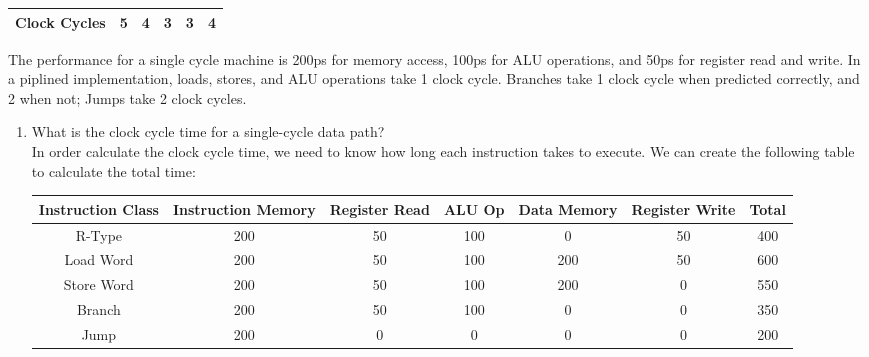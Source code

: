 \documentclass{article}
\begin{document}
\begin{enumerate}
\begin{center}
\begin{tabular}{|l|c|c|c|c|c|}
\hline
Clock Cycles & 5 & 4 & 3 & 3 & 4\\
\hline
\end{tabular}
\end{center}
The performance for a single cycle machine is 200ps for memory access, 100ps for ALU operations, and 50ps for register read and write.
In a piplined implementation, loads, stores, and ALU operations take 1 clock cycle.
Branches take 1 clock cycle when predicted correctly, and 2 when not;
Jumps take 2 clock cycles.
\begin{enumerate}
\item What is the clock cycle time for a single-cycle data path?\\
\indent In order calculate the clock cycle time, we need to know how long each instruction takes to execute.
We can create the following table to calculate the total time:\\

\hspace*{-1.7cm}
\begin{tabular}{|c|c|c|c|c|c|c|}
\hline
Instruction Class & Instruction Memory & Register Read & ALU Op & Data Memory & Register Write & Total\\
\hline
R-Type & 200 & 50 & 100 & 0 & 50 & 400\\
\hline
Load Word & 200 & 50 & 100 & 200 & 50 & 600\\
\hline
Store Word & 200 & 50 & 100 & 200 & 0 & 550\\
\hline
Branch & 200 & 50 & 100 & 0 & 0 & 350\\
\hline
Jump & 200 & 0 & 0 & 0 & 0 & 200\\
\hline
\end{tabular}
\vspace{0.1cm}


\end{enumerate}
\end{enumerate}
\end{document}
